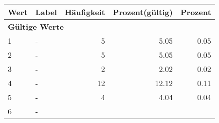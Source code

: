      \begin{longtable}{lXrrr}
     \toprule
     \textbf{Wert} & \textbf{Label} & \textbf{Häufigkeit} & \textbf{Prozent(gültig)} & \textbf{Prozent} \\
     \endhead
     \midrule
     \multicolumn{5}{l}{\textbf{Gültige Werte}}\\

     1 &
     \multicolumn{1}{X}{ -  } &


       \num{5} &
       \num[round-mode=places,round-precision=2]{5.05} &
         \num[round-mode=places,round-precision=2]{0.05} \\

     2 &
     \multicolumn{1}{X}{ -  } &


       \num{5} &
       \num[round-mode=places,round-precision=2]{5.05} &
         \num[round-mode=places,round-precision=2]{0.05} \\

     3 &
     \multicolumn{1}{X}{ -  } &


       \num{2} &
       \num[round-mode=places,round-precision=2]{2.02} &
         \num[round-mode=places,round-precision=2]{0.02} \\

     4 &
     \multicolumn{1}{X}{ -  } &


       \num{12} &
       \num[round-mode=places,round-precision=2]{12.12} &
         \num[round-mode=places,round-precision=2]{0.11} \\

     5 &
     \multicolumn{1}{X}{ -  } &


       \num{4} &
       \num[round-mode=places,round-precision=2]{4.04} &
         \num[round-mode=places,round-precision=2]{0.04} \\

     6 &
     \multicolumn{1}{X}{ -  } &



\end{longtable}
